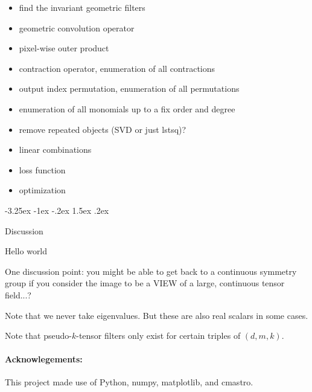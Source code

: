 \documentclass{article}
\makeatletter
\theoremstyle{plain}
\renewcommand\section{\@startsection {section}{1}{\z@}%
  {-3.25ex \@plus -1ex \@minus -.2ex}%
  {1.5ex \@plus .2ex}%
  {\raggedright\normalfont\large\bfseries}}
\makeatother
\begin{document}
\begin{itemize}
    \item find the invariant geometric filters
    \item geometric convolution operator
    \item pixel-wise outer product
    \item contraction operator, enumeration of all contractions
    \item output index permutation, enumeration of all permutations
    \item enumeration of all monomials up to a fix order and degree 
    \item remove repeated objects (SVD or just lstsq)?
    \item linear combinations 
    \item loss function
    \item optimization
\end{itemize}


\section{Discussion}\label{sec:discussion}

Hello world

One discussion point: you might be able to get back to a continuous symmetry group if you consider the image to be a VIEW of a large, continuous tensor field...?




Note that we never take eigenvalues. But these are also real scalars in some cases.

Note that pseudo-$k$-tensor filters only exist for certain triples of $(d, m, k)$.

\paragraph{Acknowlegements:}
This project made use of Python, numpy, matplotlib, and cmastro. 
\end{document}
